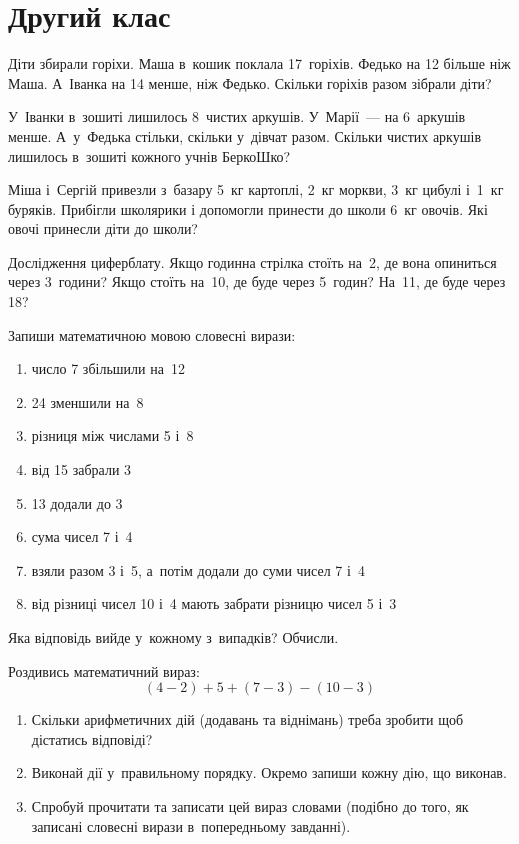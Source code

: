 \chapter{Другий клас}

\problem
Діти збирали горіхи. Маша в~кошик поклала 17~горіхів.
Федько на 12 більше ніж Маша. А~Іванка на 14 менше, ніж Федько.
Скільки горіхів разом зібрали діти?


\problem
У~Іванки в~зошиті лишилось 8~чистих аркушів.
У~Марії~--- на 6~аркушів менше.
А~у~Федька стільки, скільки у~дівчат разом.
Скільки чистих аркушів лишилось в~зошиті кожного учнів БеркоШко?


\problem
Міша і~Сергій привезли з~базару 5~кг картоплі, 2~кг моркви,
3~кг цибулі і~1~кг буряків.
Прибігли школярики і допомогли принести до школи 6~кг овочів.
Які овочі принесли діти до школи?


\problem
Дослідження циферблату.
Якщо годинна стрілка стоїть на~2, де вона опиниться через 3~години?
Якщо стоїть на~10, де буде через 5~годин?
На~11, де буде через 18?


\problem
Запиши математичною мовою словесні вирази:
\begin{enumerate}
    \item число 7 збільшили на~12
    \item 24 зменшили на~8
    \item різниця між числами 5 і~8
    \item від 15 забрали 3
    \item 13 додали до 3
    \item сума чисел 7 і~4
    \item взяли разом 3 і~5, а~потім додали до суми чисел 7 і~4
    \item від різниці чисел 10 і~4 мають забрати різницю чисел 5 і~3
\end{enumerate}
Яка відповідь вийде у~кожному з~випадків? Обчисли.


\problem
Роздивись математичний вираз:
\[
(4 - 2) + 5 + (7 - 3) - (10 - 3)
\]
\begin{enumerate}
    \item Скільки арифметичних дій (додавань та віднімань)
    треба зробити щоб дістатись відповіді?
    \item Виконай дії у~правильному порядку.
    Окремо запиши кожну дію, що виконав.
    \item Спробуй прочитати та записати цей вираз словами
    (подібно до того, як записані словесні вирази в~попередньому завданні).
\end{enumerate}


